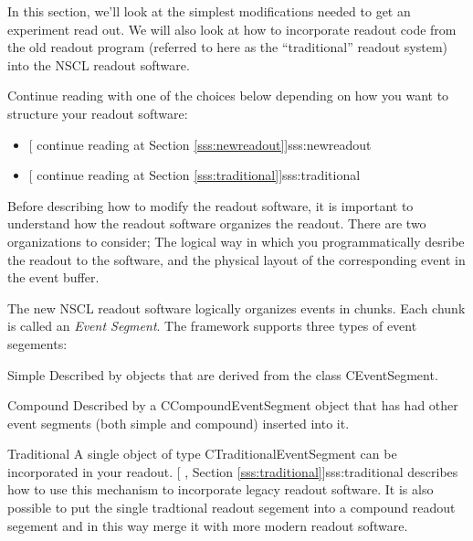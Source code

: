       In this section, we'll look at the simplest modifications
      needed to get an experiment read out.  We will also look
      at how to incorporate readout code from the old readout 
      program
      (referred to here as the ``traditional'' readout system)
      into the NSCL readout software.
      
      Continue reading with one of the choices below 
      depending on how
      you want to structure your readout software:
      
      \begin{itemize}
	 \item {}[
	    continue reading at Section 
	    \ref{sss:newreadout}]{sss:newreadout}
	 \item {}[
	    continue reading at Section 
	    \ref{sss:traditional}]{sss:traditional}
      \end{itemize}
      

      
      Before describing how to modify the readout software, it is 
      important to understand how the readout software organizes
      the readout.  There are two organizations to consider; The 
      logical way in which you programmatically desribe the 
      readout to the software, and the physical layout of the
      corresponding event in the event buffer.
      
      The new NSCL readout software logically 
      organizes events in chunks. 
      Each chunk is
      called an {\em Event Segment}.  The framework supports three
      types of event segements:
      \begin{description}
	 \item{Simple}  Described by objects that are
	    derived from the class CEventSegment.
	 \item{Compound} Described by a CCompoundEventSegment
	    object that has had other event segments (both simple
	    and compound) inserted into it.
	 \item{Traditional}  A single object of type 
	    CTraditionalEventSegment can be incorporated in your
	    readout.  
	    [
	    , Section \ref{sss:traditional}]{sss:traditional} 
	    describes how to use this mechanism to incorporate
	    legacy readout software.  It is also possible to
	    put the single tradtional readout segement into
	    a compound readout segement and in this way merge it
	    with more modern readout software.
      \end{description}
      
